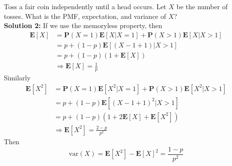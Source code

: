 \begin{example}
    Toss a fair coin independently until a head occurs. Let $X$ be the number of tosses. What is the PMF, expectation, and variance of $X$? \\ 
    \textbf{Solution 2:} If we use the memoryless property, then 
    \begin{equation}
    \begin{aligned}
        \mathbf{E}[X] &= \mathbf{P}(X = 1)\mathbf{E}[X | X = 1] + \mathbf{P}(X > 1)\mathbf{E}[X | X > 1] \\ 
        &= p + (1-p)\mathbf{E}[(X - 1 + 1) | X > 1] \\
        &= p + (1-p)(1 + \mathbf{E}[X]) \\ 
        &\Rightarrow \mathbf{E}[X] = \frac{1}{p}
    \end{aligned}
    \end{equation}
    Similarly
    \begin{equation}
    \begin{aligned}
        \mathbf{E}[X^2] &= \mathbf{P}(X = 1)\mathbf{E}[X^2 | X = 1] + \mathbf{P}(X > 1)\mathbf{E}[X^2 | X > 1] \\
        &= p + (1-p)\mathbf{E}[(X - 1 + 1)^2 | X > 1] \\
        &= p + (1-p)(1 + 2\mathbf{E}[X] + \mathbf{E}[X^2]) \\
        &\Rightarrow \mathbf{E}[X^2] = \frac{2-p}{p^2}
    \end{aligned}
    \end{equation}
    Then
    \begin{equation}
        \text{var}(X) = \mathbf{E}[X^2] - \mathbf{E}[X]^2 = \frac{1-p}{p^2}
    \end{equation}
\end{example}

